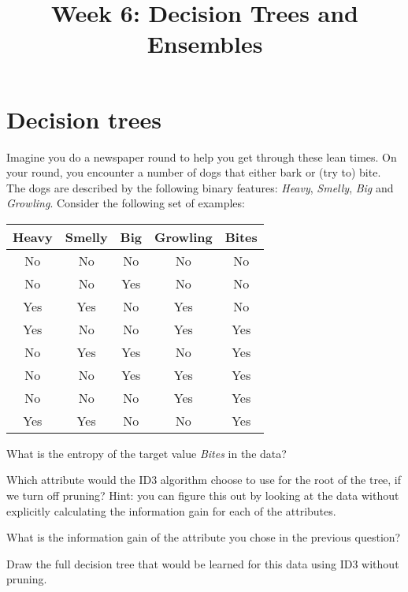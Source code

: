 \documentclass[11pt]{article}
\title{Week 6: Decision Trees and Ensembles}
\begin{document}
\maketitle

\section{Decision trees}

Imagine you do a newspaper round to help you get through these lean times.  On your round, you encounter a number of dogs that either bark or (try to) bite. The dogs are described by the following binary features: \emph{Heavy}, \emph{Smelly}, \emph{Big} and \emph{Growling}. Consider the following set of examples:

\begin{center}
\begin{tabular}{c  c  c  c  | c }
Heavy & Smelly &  Big & Growling & Bites \\
\hline
No & No & No & No & No \\
No & No & Yes & No & No \\
Yes & Yes & No & Yes & No \\
Yes & No & No & Yes & Yes \\
No & Yes & Yes & No & Yes \\
No & No & Yes & Yes & Yes \\
No & No & No & Yes & Yes \\
Yes & Yes & No & No & Yes \\
\hline
\end{tabular}
\end{center}


What is the entropy of the target value \emph{Bites} in the data?
\ans{
\[H(Bites)= − \sfrac{5}{8}\log_2\sfrac{5}{8} - \sfrac{3}{8}\log_2\sfrac{3}{8} \approx 0.9544\]
}{}


Which attribute would the ID3 algorithm choose to use for the root of the tree, if we turn off pruning? Hint: you can figure this out by looking at the data without explicitly calculating the information gain for each of the attributes.


What is the information gain of the attribute you chose in the previous question?


Draw the full decision tree that would be learned for this data using ID3 without pruning.

\end{document}
